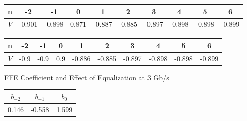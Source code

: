 \documentclass{book}  %
\begin{document}
\begin{paper}
\begin{figure}
	\begin{minipage}[tb]{\textwidth}
		\centering	
		\begin{tabular}{|c|c|c|c|c|c|c|c|c|c|}\hline
			n  &   -2   &   -1   &   0   &    1   &    2   &    3   &    4   &    5   &    6   \\ \hline 
			$V$ & -0.901 & -0.898 & 0.871 & -0.887 & -0.885 & -0.897 & -0.898 & -0.898 & -0.899 \\ \hline
		\end{tabular} 
		\label{table:3G_rxdiff_sample_wo_FFE}
	\end{minipage}	
	\begin{minipage}[tb]{\textwidth}
		\centering	
		\begin{tabular}{|c|c|c|c|c|c|c|c|c|c|}\hline
			n  &  -2  &  -1  &  0  &    1   &    2   &    3   &    4   &    5   &    6   \\ \hline 
			$V$ & -0.9 & -0.9 & 0.9 & -0.886 & -0.885 & -0.897 & -0.898 & -0.898 & -0.899 \\ \hline
		\end{tabular}
		\label{table:3G_rxdiff_sample_w__FFE} 
	\end{minipage}
	\caption{FFE Coefficient and Effect of Equalization at 3 Gb/s}
\end{figure}


\begin{figure}
	\centering	
	\begin{minipage}[tb]{\textwidth}
		\centering	
		\begin{tabular}{|c|c|c|}\hline
			$b_{-2}$ & $b_{-1}$ &  $b_{0}$ \\ \hline 
			0.146 &   -0.558 &    1.599 \\ \hline
		\end{tabular}
		\label{table:20G_FFE_coeff} 
	\end{minipage}%
	

\end{figure}
\end{paper}
\end{document}
